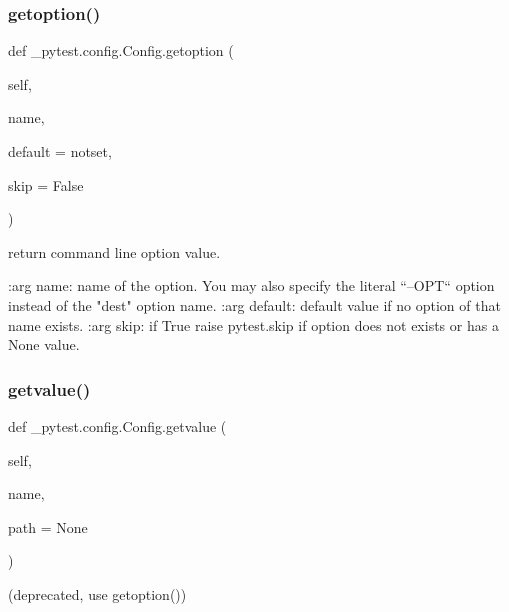 \subsubsection{\texorpdfstring{getoption()}{getoption()}}
{\footnotesize\ttfamily def \+\_\+pytest.\+config.\+Config.\+getoption (\begin{DoxyParamCaption}\item[{}]{self,  }\item[{}]{name,  }\item[{}]{default = {\ttfamily notset},  }\item[{}]{skip = {\ttfamily False} }\end{DoxyParamCaption})}

\begin{DoxyVerb}return command line option value.

:arg name: name of the option.  You may also specify
    the literal ``--OPT`` option instead of the "dest" option name.
:arg default: default value if no option of that name exists.
:arg skip: if True raise pytest.skip if option does not exists
    or has a None value.
\end{DoxyVerb}
 \mbox{\label{class__pytest_1_1config_1_1_config_a0692b1f22b04733c02019c86f9141030}} 
\subsubsection{\texorpdfstring{getvalue()}{getvalue()}}
{\footnotesize\ttfamily def \+\_\+pytest.\+config.\+Config.\+getvalue (\begin{DoxyParamCaption}\item[{}]{self,  }\item[{}]{name,  }\item[{}]{path = {\ttfamily None} }\end{DoxyParamCaption})}

\begin{DoxyVerb}(deprecated, use getoption()) \end{DoxyVerb}
 \mbox{\label{class__pytest_1_1config_1_1_config_a83ddb8e23b7d52dc3beafe987b88cec0}} 
